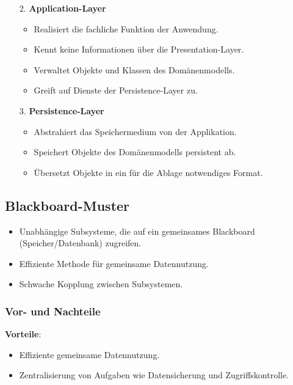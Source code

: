 \documentclass[11pt, a4paper]{article}
\begin{document}
\begin{minipage}[h]{0.45\textwidth}
    \tiny
    \begin{enumerate}
        \item[2.] \textbf{Application-Layer}
        \begin{itemize}
            \item Realisiert die fachliche Funktion der Anwendung.
            \item Kennt keine Informationen über die Presentation-Layer.
            \item Verwaltet Objekte und Klassen des Domänenmodells.
            \item Greift auf Dienste der Persistence-Layer zu.
        \end{itemize}
    \end{enumerate}
\end{minipage}
\begin{minipage}[h]{0.45\textwidth}
    \tiny
    \begin{enumerate}
        \item[3.] \textbf{Persistence-Layer}
        \begin{itemize}
            \item Abstrahiert das Speichermedium von der Applikation.
            \item Speichert Objekte des Domänenmodells persistent ab.
            \item Übersetzt Objekte in ein für die Ablage notwendiges Format.
        \end{itemize}
    \end{enumerate}
\end{minipage}

\newpage

\subsection{Blackboard-Muster}

\begin{itemize}
    \item Unabhängige Subsysteme, die auf ein gemeinsames Blackboard (Speicher/Datenbank) zugreifen.
    \item Effiziente Methode für gemeinsame Datennutzung.
    \item Schwache Kopplung zwischen Subsystemen.
\end{itemize}

\subsubsection{Vor- und Nachteile}
\textbf{Vorteile}:
\begin{itemize}
    \item Effiziente gemeinsame Datennutzung.
    \item Zentralisierung von Aufgaben wie Datensicherung und Zugriffskontrolle.
\end{itemize}
\end{document}
